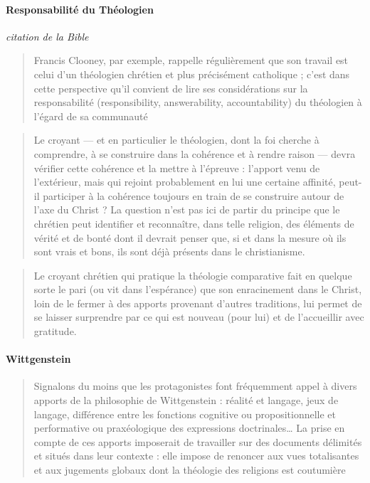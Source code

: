 \paragraph{Responsabilité du Théologien} \textit{citation de la Bible}
 \begin{quote}
        Francis Clooney, par exemple, rappelle régulièrement que son travail est celui d’un théologien chrétien et plus précisément catholique ; c’est dans cette perspective qu’il convient de lire ses considérations sur la responsabilité (responsibility, answerability, accountability) du théologien à l’égard de sa communauté
\end{quote}
 \begin{quote}
        Le croyant — et en particulier le théologien, dont la foi cherche à comprendre, à se construire dans la cohérence et à rendre raison — devra vérifier cette cohérence et la mettre à l’épreuve : l’apport venu de l’extérieur, mais qui rejoint probablement en lui une certaine affinité, peut-il participer à la cohérence toujours en train de se construire autour de l’axe du Christ ? La question n’est pas ici de partir du principe que le chrétien peut identifier et reconnaître, dans telle religion, des éléments de vérité et de bonté dont il devrait penser que, si et dans la mesure où ils sont vrais et bons, ils sont déjà présents dans le christianisme.
\end{quote}

\begin{quote}
        Le croyant chrétien qui pratique la théologie comparative fait en quelque sorte le pari (ou vit dans l’espérance) que son enracinement dans le Christ, loin de le fermer à des apports provenant d’autres traditions, lui permet de se laisser surprendre par ce qui est nouveau (pour lui) et de l’accueillir avec gratitude.
\end{quote}

\paragraph{Wittgenstein}
\begin{quote}
        Signalons du moins que les protagonistes font fréquemment appel à divers apports de la philosophie de Wittgenstein : réalité et langage, jeux de langage, différence entre les fonctions cognitive ou propositionnelle et performative ou praxéologique des expressions doctrinales… La prise en compte de ces apports imposerait de travailler sur des documents délimités et situés dans leur contexte : elle impose de renoncer aux vues totalisantes et aux jugements globaux dont la théologie des religions est coutumière
\end{quote}

